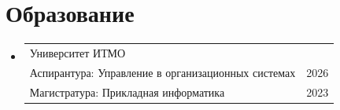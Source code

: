 \documentclass[letterpaper,11pt]{article}
\makeatletter
\newcommand{\resumeEducationHeading}[6]{
  \vspace{-2pt}\item
    \begin{tabular*}{0.97\textwidth}[t]{l@{\extracolsep{\fill}}r}
      #1 & #2 \\
      #3 & #4 \\
      #5 & #6 \\
    \end{tabular*}\vspace{-5pt}
}
\newcommand{\resumeSubHeadingListStart}{\begin{itemize}[leftmargin=0.15in, label={}, topsep=0pt, itemsep=0pt, parsep=0pt, partopsep=0pt]}
\newcommand{\resumeSubHeadingListEnd}{\end{itemize}}
\makeatother
\begin{document}
\section{Образование}
  \vspace{3pt}
  \resumeSubHeadingListStart
    
  \resumeEducationHeading
   {Университет ИТМО}
   {}
   {Аспирантура: Управление в организационных системах}{2026}
   {Магистратура: Прикладная информатика}  {2023}
    
  \resumeSubHeadingListEnd

        
\end{document}
